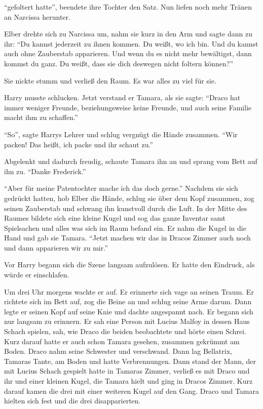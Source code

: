 \enquote{\aabs gefoltert hatte}, beendete ihre Tochter den Satz. Nun liefen noch mehr Tränen an Narcissa herunter.

Elber drehte sich zu Narcissa um, nahm sie kurz in den Arm und sagte dann zu ihr: \enquote{Du kannst jederzeit zu ihnen kommen. Du weißt, wo ich bin. Und du kannst auch ohne Zauberstab apparieren. Und wenn du es nicht mehr bewältigst, dann kommst du ganz. Du weißt, dass sie dich deswegen nicht foltern können?}

Sie nickte stumm und verließ den Raum. Es war alles zu viel für sie.

Harry musste schlucken. Jetzt verstand er Tamara, als sie sagte: \enquote{Draco hat immer weniger Freunde, beziehungsweise keine Freunde, und auch seine Familie macht ihm zu schaffen.}

\enquote{So}, sagte Harrys Lehrer und schlug vergnügt die Hände zusammen. \enquote{Wir packen! Das heißt, ich packe und ihr schaut zu.}

Abgelenkt und dadurch freudig, schaute Tamara ihn an und sprang vom Bett auf ihn zu. \enquote{Danke Frederick.}

\enquote{Aber für meine Patentochter mache ich das doch gerne.} Nachdem sie sich gedrückt hatten, hob Elber die Hände, schlug sie über dem Kopf zusammen, zog seinen Zauberstab und schwang ihn kunstvoll durch die Luft. In der Mitte des Raumes bildete sich eine kleine Kugel und sog das ganze Inventar samt Spielsachen und alles was sich im Raum befand ein. Er nahm die Kugel in die Hand und gab sie Tamara. \enquote{Jetzt machen wir das in Dracos Zimmer auch noch und dann apparieren wir zu mir.}

Vor Harry begann sich die Szene langsam aufzulösen. Er hatte den Eindruck, als würde er einschlafen.

Um drei Uhr morgens wachte er auf. Er erinnerte sich vage an seinen Traum. Er richtete sich im Bett auf, zog die Beine an und schlug seine Arme darum. Dann legte er seinen Kopf auf seine Knie und dachte angespannt nach. Er begann sich nur langsam zu erinnern. Er sah eine Person mit Lucius Malfoy in dessen Haus Schach spielen, sah, wie Draco die beiden beobachtete und hörte einen Schrei. Kurz darauf hatte er auch schon Tamara gesehen, zusammen gekrümmt am Boden. Draco nahm seine Schwester und verschwand. Dann lag Bellatrix, Tamaras Tante, am Boden und hatte Verbrennungen. Dann stand der Mann, der mit Lucius Schach gespielt hatte in Tamaras Zimmer, verließ es mit Draco und ihr und einer kleinen Kugel, die Tamara hielt und ging in Dracos Zimmer. Kurz darauf kamen die drei mit einer weiteren Kugel auf den Gang. Draco und Tamara hielten sich fest und die drei disapparierten.

